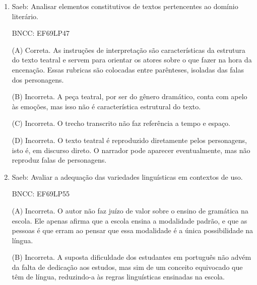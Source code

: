 \begin{enumerate}
(B) Incorreta. A forma verbal está no modo subjuntivo, que expressa
dúvida e hipótese. Porém, a notícia não faz juízo de valor sobre o fato,
já que essa não é uma das características desse gênero textual.

(C) Correta. O jornal traz uma notícia que não é nova ou inédita. Ele
está apenas relatando uma denúncia já feita antes numa reportagem por
outro veículo de informação. Por isso, usa a forma verbal conjugada no
futuro do pretérito, de modo a evitar assumir a responsabilidade pela
afirmação e, ao mesmo tempo, atribuí-la a um terceiro.

(D) Incorreta. A reportagem citada na notícia qualificou a distorção dos
conceitos como algo ilegal, por deturpar as orientações dadas a
policiais num curso de formação, e a notícia manteve o tom de gravidade
da prática.

\item

Saeb: Analisar elementos constitutivos de textos pertencentes ao domínio
literário.

BNCC: EF69LP47

(A) Correta. As instruções de interpretação são características da
estrutura do texto teatral e servem para orientar os atores sobre o que
fazer na hora da encenação. Essas rubricas são colocadas entre
parênteses, isoladas das falas dos personagens.

(B) Incorreta. A peça teatral, por ser do gênero dramático, conta com
apelo às emoções, mas isso não é característica estrutural do texto.

(C) Incorreta. O trecho transcrito não faz referência a tempo e espaço.

(D) Incorreta. O texto teatral é reproduzido diretamente pelos
personagens, isto é, em discurso direto. O narrador pode aparecer
eventualmente, mas não reproduz falas de personagens.

\item

Saeb: Avaliar a adequação das variedades linguísticas em contextos de
uso.

BNCC: EF69LP55

(A) Incorreta. O autor não faz juízo de valor sobre o ensino de
gramática na escola. Ele apenas afirma que a escola ensina a modalidade
padrão, e que as pessoas é que erram ao pensar que essa modalidade é a
única possibilidade na língua.

(B) Incorreta. A suposta dificuldade dos estudantes em português não
advém da falta de dedicação aos estudos, mas sim de um conceito
equivocado que têm de língua, reduzindo-a às regras linguísticas
ensinadas na escola.


\end{enumerate}
